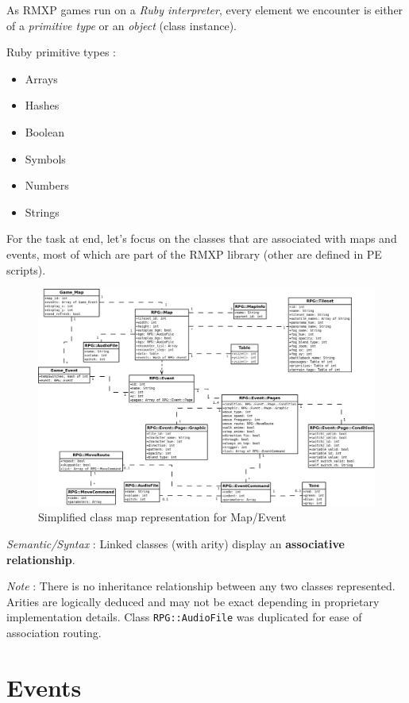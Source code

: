 \documentclass[11pt]{article}
\begin{document}
As RMXP games run on a \textit{Ruby interpreter}, every element we encounter is either of a \textit{primitive type} or an \textit{object} (class instance).

Ruby primitive types :
\begin{itemize}
	\item Arrays
	\item Hashes
	\item Boolean
	\item Symbols
	\item Numbers
	\item Strings
	
\end{itemize}

\vspace{2mm}
For the task at end, let's focus on the classes that are associated with maps and events, most of which are part of the RMXP library (other are defined in PE scripts).

\begin{figure}[!h]
	\centering
	\includegraphics[width=\linewidth]{RMXP_full}
		\caption{Simplified class map representation for Map/Event}
	
\end{figure}


\textit{Semantic/Syntax} : Linked classes (with arity) display an \textbf{associative relationship}.

\textit{Note} : There is no inheritance relationship between any two classes represented. Arities are logically deduced and may not be exact depending in proprietary implementation details. Class \verb|RPG::AudioFile| was duplicated for ease of association routing.


\newpage
\section{Events}
\end{document}
